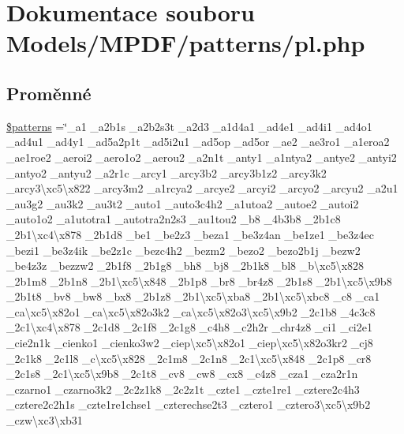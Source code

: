 \hypertarget{pl_8php}{\section{Dokumentace souboru Models/\-M\-P\-D\-F/patterns/pl.php}
\label{pl_8php}
}
\subsection*{Proměnné}
\begin{DoxyCompactItemize}
\item 
\hyperlink{pl_8php_a99c668c59ad650ca9b31ad5313dc5720}{\$patterns} =\char`\"{}\-\_\-a1 \-\_\-a2b1s \-\_\-a2b2s3t \-\_\-a2d3 \-\_\-a1d4a1 \-\_\-ad4e1 \-\_\-ad4i1 \-\_\-ad4o1 \-\_\-ad4u1 \-\_\-ad4y1 \-\_\-ad5a2p1t \-\_\-ad5i2u1 \-\_\-ad5op \-\_\-ad5or \-\_\-ae2 \-\_\-ae3ro1 \-\_\-a1eroa2 \-\_\-ae1roe2 \-\_\-aeroi2 \-\_\-aero1o2 \-\_\-aerou2 \-\_\-a2n1t \-\_\-anty1 \-\_\-a1ntya2 \-\_\-antye2 \-\_\-antyi2 \-\_\-antyo2 \-\_\-antyu2 \-\_\-a2r1c \-\_\-arcy1 \-\_\-arcy3b2 \-\_\-arcy3b1z2 \-\_\-arcy3k2 \-\_\-arcy3\textbackslash{}xc5\textbackslash{}x822 \-\_\-arcy3m2 \-\_\-a1rcya2 \-\_\-arcye2 \-\_\-arcyi2 \-\_\-arcyo2 \-\_\-arcyu2 \-\_\-a2u1 \-\_\-au3g2 \-\_\-au3k2 \-\_\-au3t2 \-\_\-auto1 \-\_\-auto3c4h2 \-\_\-a1utoa2 \-\_\-autoe2 \-\_\-autoi2 \-\_\-auto1o2 \-\_\-a1utotra1 \-\_\-autotra2n2s3 \-\_\-au1tou2 \-\_\-b8 \-\_\-4b3b8 \-\_\-2b1c8 \-\_\-2b1\textbackslash{}xc4\textbackslash{}x878 \-\_\-2b1d8 \-\_\-be1 \-\_\-be2z3 \-\_\-beza1 \-\_\-be3z4an \-\_\-be1ze1 \-\_\-be3z4ec \-\_\-bezi1 \-\_\-be3z4ik \-\_\-be2z1c \-\_\-bezc4h2 \-\_\-bezm2 \-\_\-bezo2 \-\_\-bezo2b1j \-\_\-bezw2 \-\_\-be4z3z \-\_\-bezzw2 \-\_\-2b1f8 \-\_\-2b1g8 \-\_\-bh8 \-\_\-bj8 \-\_\-2b1k8 \-\_\-bl8 \-\_\-b\textbackslash{}xc5\textbackslash{}x828 \-\_\-2b1m8 \-\_\-2b1n8 \-\_\-2b1\textbackslash{}xc5\textbackslash{}x848 \-\_\-2b1p8 \-\_\-br8 \-\_\-br4z8 \-\_\-2b1s8 \-\_\-2b1\textbackslash{}xc5\textbackslash{}x9b8 \-\_\-2b1t8 \-\_\-bv8 \-\_\-bw8 \-\_\-bx8 \-\_\-2b1z8 \-\_\-2b1\textbackslash{}xc5\textbackslash{}xba8 \-\_\-2b1\textbackslash{}xc5\textbackslash{}xbc8 \-\_\-c8 \-\_\-ca1 \-\_\-ca\textbackslash{}xc5\textbackslash{}x82o1 \-\_\-ca\textbackslash{}xc5\textbackslash{}x82o3k2 \-\_\-ca\textbackslash{}xc5\textbackslash{}x82o3\textbackslash{}xc5\textbackslash{}x9b2 \-\_\-2c1b8 \-\_\-4c3c8 \-\_\-2c1\textbackslash{}xc4\textbackslash{}x878 \-\_\-2c1d8 \-\_\-2c1f8 \-\_\-2c1g8 \-\_\-c4h8 \-\_\-c2h2r \-\_\-chr4z8 \-\_\-ci1 \-\_\-ci2e1 \-\_\-cie2n1k \-\_\-cienko1 \-\_\-cienko3w2 \-\_\-ciep\textbackslash{}xc5\textbackslash{}x82o1 \-\_\-ciep\textbackslash{}xc5\textbackslash{}x82o3kr2 \-\_\-cj8 \-\_\-2c1k8 \-\_\-2c1l8 \-\_\-c\textbackslash{}xc5\textbackslash{}x828 \-\_\-2c1m8 \-\_\-2c1n8 \-\_\-2c1\textbackslash{}xc5\textbackslash{}x848 \-\_\-2c1p8 \-\_\-cr8 \-\_\-2c1s8 \-\_\-2c1\textbackslash{}xc5\textbackslash{}x9b8 \-\_\-2c1t8 \-\_\-cv8 \-\_\-cw8 \-\_\-cx8 \-\_\-c4z8 \-\_\-cza1 \-\_\-cza2r1n \-\_\-czarno1 \-\_\-czarno3k2 \-\_\-2c2z1k8 \-\_\-2c2z1t \-\_\-czte1 \-\_\-czte1re1 \-\_\-cztere2c4h3 \-\_\-cztere2c2h1s \-\_\-czte1re1chse1 \-\_\-czterechse2t3 \-\_\-cztero1 \-\_\-cztero3\textbackslash{}xc5\textbackslash{}x9b2 \-\_\-czw\textbackslash{}xc3\textbackslash{}xb31 
\end{DoxyCompactItemize}
